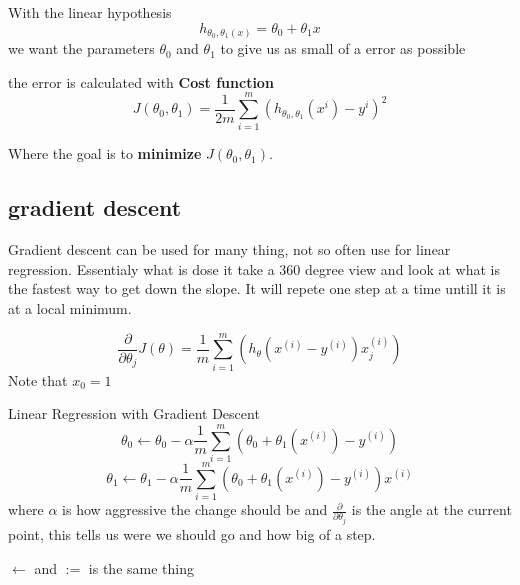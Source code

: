 With the linear hypothesis
\begin{equation*}
    h_{\theta_0,\theta_1(x)} = \theta_0 + \theta_1 x
\end{equation*}
we want the parameters $\theta_0$ and $\theta_1$ to give us as small of a error as possible

the error is calculated with \textbf{Cost function} 
\begin{equation*}
    J(\theta_0,\theta_1) = \frac{1}{2m}\sum_{i=1}^{m}(h_{\theta_0,\theta_1}(x^i)-y^i)^2
\end{equation*}

Where the goal is to \textbf{minimize} $J(\theta_0,\theta_1)$.

\subsection{gradient descent}

Gradient descent can be used for many thing, not so often use for linear regression.
Essentialy what is dose it take a 360 degree view and look at what is the fastest way
to get down the slope. It will repete one step at a time untill it is at a local minimum.

\begin{equation*}
    \frac{\partial}{\partial\theta_j}J(\theta) = \frac{1}{m}\sum_{i=1}^m \left( h_{\theta}(x^{(i)} -y^{(i)})x_j^{(i)} \right)
\end{equation*}
Note that $x_0=1$


\begin{definitionblock}{Linear Regression with Gradient Descent}
    \begin{equation*}
        \theta_0 \gets \theta_0 - \alpha\frac{1}{m}\sum_{i=1}^{m}(\theta_0 + \theta_1(x^{(i)}) - y^{(i)})
    \end{equation*} 
    \begin{equation*}
        \theta_1 \gets \theta_1 - \alpha\frac{1}{m}\sum_{i=1}^{m}(\theta_0 + \theta_1(x^{(i)}) - y^{(i)}) x^{(i)}
    \end{equation*} 
    where $\alpha$ is how aggressive the change should be and $\frac{\partial}{\partial\theta_j}$
    is the angle at the current point, this tells us were we should go and how big of a step.
\end{definitionblock}
$\gets$ and $:=$ is the same thing

